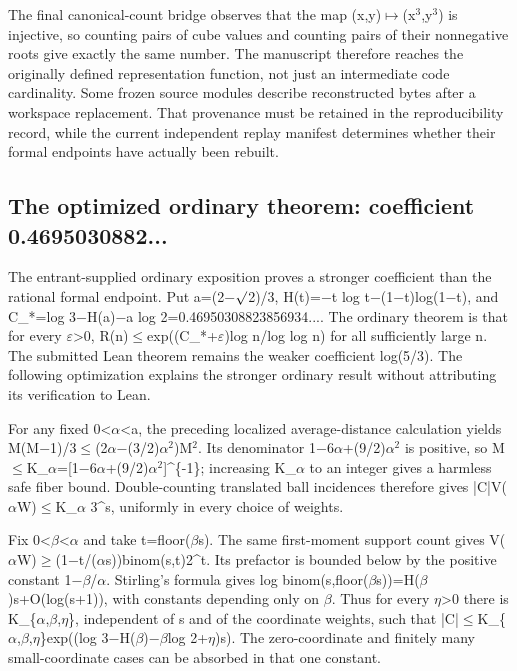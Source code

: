 \documentclass[11pt,a4paper]{article}
\begin{document}
The final canonical-count bridge observes that the map (x,y)\ensuremath{\mapsto}(x\ensuremath{^3},y\ensuremath{^3}) is injective, so counting pairs of cube values and counting pairs of their nonnegative roots give exactly the same number. The manuscript therefore reaches the originally defined representation function, not just an intermediate code cardinality. Some frozen source modules describe reconstructed bytes after a workspace replacement. That provenance must be retained in the reproducibility record, while the current independent replay manifest determines whether their formal endpoints have actually been rebuilt.

\subsection{The optimized ordinary theorem: coefficient 0.4695030882...}
The entrant-supplied ordinary exposition proves a stronger coefficient than the rational formal endpoint. Put a=(2\ensuremath{-}\ensuremath{\surd}2)/3, H(t)=\ensuremath{-}t log t\ensuremath{-}(1\ensuremath{-}t)log(1\ensuremath{-}t), and C\_*=log 3\ensuremath{-}H(a)\ensuremath{-}a log 2=0.46950308823856934.... The ordinary theorem is that for every \ensuremath{\varepsilon}>0, R(n)\ensuremath{\leq}exp((C\_*+\ensuremath{\varepsilon})log n/log log n) for all sufficiently large n. The submitted Lean theorem remains the weaker coefficient log(5/3). The following optimization explains the stronger ordinary result without attributing its verification to Lean.

For any fixed 0<\ensuremath{\alpha}<a, the preceding localized average-distance calculation yields M(M\ensuremath{-}1)/3\ensuremath{\leq}(2\ensuremath{\alpha}\ensuremath{-}(3/2)\ensuremath{\alpha}\ensuremath{^2})M\ensuremath{^2}. Its denominator 1\ensuremath{-}6\ensuremath{\alpha}+(9/2)\ensuremath{\alpha}\ensuremath{^2} is positive, so M\ensuremath{\leq}K\_\ensuremath{\alpha}=[1\ensuremath{-}6\ensuremath{\alpha}+(9/2)\ensuremath{\alpha}\ensuremath{^2}]\textasciicircum{}\{-1\}; increasing K\_\ensuremath{\alpha} to an integer gives a harmless safe fiber bound. Double-counting translated ball incidences therefore gives |C|V(\ensuremath{\alpha}W)\ensuremath{\leq}K\_\ensuremath{\alpha} 3\textasciicircum{}s, uniformly in every choice of weights.

Fix 0<\ensuremath{\beta}<\ensuremath{\alpha} and take t=floor(\ensuremath{\beta}s). The same first-moment support count gives V(\ensuremath{\alpha}W)\ensuremath{\geq}(1\ensuremath{-}t/(\ensuremath{\alpha}s))binom(s,t)2\textasciicircum{}t. Its prefactor is bounded below by the positive constant 1\ensuremath{-}\ensuremath{\beta}/\ensuremath{\alpha}. Stirling's formula gives log binom(s,floor(\ensuremath{\beta}s))=H(\ensuremath{\beta})s+O(log(s+1)), with constants depending only on \ensuremath{\beta}. Thus for every \ensuremath{\eta}>0 there is K\_\{\ensuremath{\alpha},\ensuremath{\beta},\ensuremath{\eta}\}, independent of s and of the coordinate weights, such that |C|\ensuremath{\leq}K\_\{\ensuremath{\alpha},\ensuremath{\beta},\ensuremath{\eta}\}exp((log 3\ensuremath{-}H(\ensuremath{\beta})\ensuremath{-}\ensuremath{\beta}log 2+\ensuremath{\eta})s). The zero-coordinate and finitely many small-coordinate cases can be absorbed in that one constant.
\end{document}
